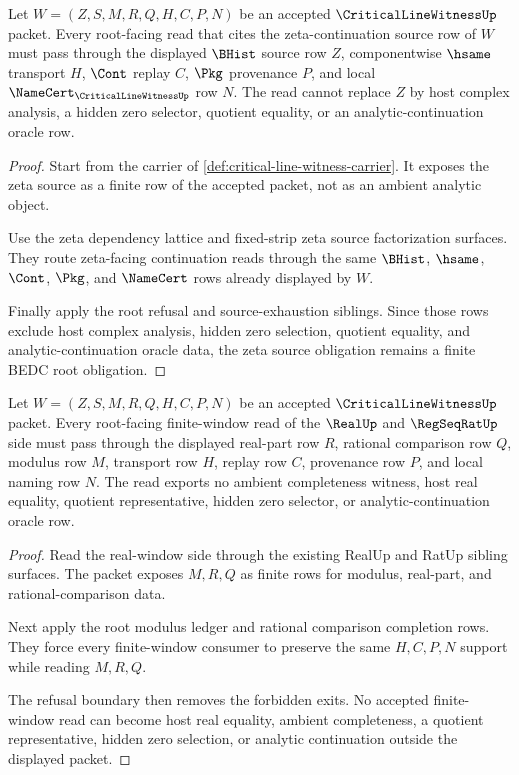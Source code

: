 \begin{theorem}
\label{thm:critical-line-witness-root-zeta-source-obligation}
Let $W=(Z,S,M,R,Q,H,C,P,N)$ be an accepted $\CriticalLineWitnessUp$ packet. Every root-facing read that cites the zeta-continuation source row of $W$ must pass through the displayed $\BHist$ source row $Z$, componentwise $\hsame$ transport $H$, $\Cont$ replay $C$, $\Pkg$ provenance $P$, and local $\NameCert_{\CriticalLineWitnessUp}$ row $N$. The read cannot replace $Z$ by host complex analysis, a hidden zero selector, quotient equality, or an analytic-continuation oracle row.
\end{theorem}
\begin{proof}
Start from the carrier of \autoref{def:critical-line-witness-carrier}. It exposes the zeta source as a finite row of the accepted packet, not as an ambient analytic object.

Use the zeta dependency lattice and fixed-strip zeta source factorization surfaces. They route zeta-facing continuation reads through the same $\BHist$, $\hsame$, $\Cont$, $\Pkg$, and $\NameCert$ rows already displayed by $W$.

Finally apply the root refusal and source-exhaustion siblings. Since those rows exclude host complex analysis, hidden zero selection, quotient equality, and analytic-continuation oracle data, the zeta source obligation remains a finite BEDC root obligation.
\end{proof}

\begin{theorem}
\label{thm:critical-line-witness-root-real-window-obligation}
Let $W=(Z,S,M,R,Q,H,C,P,N)$ be an accepted $\CriticalLineWitnessUp$ packet. Every root-facing finite-window read of the $\RealUp$ and $\RegSeqRatUp$ side must pass through the displayed real-part row $R$, rational comparison row $Q$, modulus row $M$, transport row $H$, replay row $C$, provenance row $P$, and local naming row $N$. The read exports no ambient completeness witness, host real equality, quotient representative, hidden zero selector, or analytic-continuation oracle row.
\end{theorem}
\begin{proof}
Read the real-window side through the existing RealUp and RatUp sibling surfaces. The packet exposes $M,R,Q$ as finite rows for modulus, real-part, and rational-comparison data.

Next apply the root modulus ledger and rational comparison completion rows. They force every finite-window consumer to preserve the same $H,C,P,N$ support while reading $M,R,Q$.

The refusal boundary then removes the forbidden exits. No accepted finite-window read can become host real equality, ambient completeness, a quotient representative, hidden zero selection, or analytic continuation outside the displayed packet.
\end{proof}

